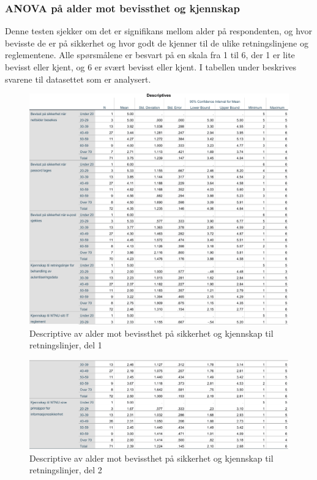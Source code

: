 \subsubsection{ANOVA på alder mot bevissthet og kjennskap}
Denne testen sjekker om det er signifikans mellom alder på respondenten, og hvor bevisste de er på sikkerhet og hvor godt de kjenner til de ulike retningslinjene og reglementene. Alle spørsmålene er besvart på en skala fra 1 til 6, der 1 er lite bevisst eller kjent, og 6 er svært bevisst eller kjent. I tabellen under beskrives svarene til datasettet som er analysert. 
\begin{figure}[H]
    \centering
    \includegraphics[scale=0.7]{case_2/bilder/spss/anova_ttest/alder_bevissthetogkjennskap_descriptive_1.pdf}
    \caption[Descriptive av alder mot bevissthet på sikkerhet og kjennskap til dokumenter del 1]{Descriptive av alder mot bevissthet på sikkerhet og kjennskap til retningslinjer, del 1}
    \label{fig:alder-bevissthetogkjennskap-descriptive-1}
\end{figure}

\begin{figure}[H]
    \centering
    \includegraphics[scale=0.7]{case_2/bilder/spss/anova_ttest/alder_bevissthetogkjennskap_descriptive_2.pdf}
    \caption[Descriptive av alder mot bevissthet på sikkerhet og kjennskap til dokumenter del 1]{Descriptive av alder mot bevissthet på sikkerhet og kjennskap til retningslinjer, del 2}
    \label{fig:alder-bevissthetogkjennskap-descriptive-2}
\end{figure}

